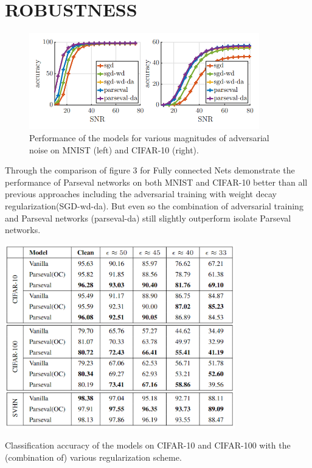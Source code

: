 \section{ROBUSTNESS}

\begin{figure}
  \begin{center}
    \includegraphics[width=10cm]{image/performance_of_the_models.png}
  \end{center}
  \caption{ Performance of the models for various magnitudes of
adversarial noise on MNIST (left) and CIFAR-10 (right).}
\end{figure}

Through the comparison of figure 3 for Fully connected Nets demonstrate the performance of Parseval networks on both MNIST and CIFAR-10 better than all previous approaches including the adversarial training with weight decay regularization(SGD-wd-da). But even so the combination of adversarial training and Parseval networks (parseval-da) still slightly outperform isolate Parseval networks.

\begin{table}
  \begin{center}
    \includegraphics[width=10cm]{image/Classification_accuracy.png}
  \end{center}
  \caption{ Classification accuracy of the models on CIFAR-10 and CIFAR-100 with the (combination of) various regularization scheme. }
\end{table}


